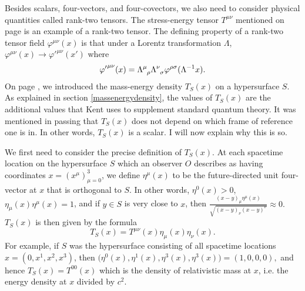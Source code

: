 Besides scalars, four-vectors, and four-covectors, we also need to consider physical quantities called rank-two tensors. The stress-energy tensor $T^{\mu\nu}$ mentioned on page \pageref{stressenergy} is an example of a rank-two tensor. The defining property of a rank-two tensor field $\varphi^{\mu\nu}(x)$ is that under a Lorentz transformation $\Lambda$, $\varphi^{\mu\nu}(x)\rightarrow{\varphi'}^{\mu\nu}(x')$ where
\begin{equation}\label{lorentztensor}
{\varphi'}^{\mu\nu}(x)=\Lambda\indices{^\mu_\rho}\Lambda\indices{^\nu_\sigma}\varphi^{\rho\sigma}(\Lambda^{-1}x).
\end{equation}
On page \pageref{massenergydensity}, we introduced the mass-energy density $T_S(x)$ on a hypersurface $S$. As explained in section \ref{massenergydensity}, the values of $T_S(x)$ are the additional values that Kent uses to supplement standard quantum theory.  It was mentioned in passing that $T_S(x)$ does not depend on which frame of reference one is in. In other words, $T_S(x)$ is a scalar. I will now explain why this is so. 

We first need to consider the precise definition of $T_S(x)$. At each spacetime location on the hypersurface $S$ which an observer $O$ describes as having coordinates $x=(x^\mu)_{\mu=0}^3$, we define  $\eta^\mu(x)$ to be the future-directed  unit four-vector at $x$ that is orthogonal to $S$. In other words, $\eta^0(x)>0$, $\eta_\mu(x)\eta^\mu(x)=1$, and if $y\in S$ is very close to $x$, then $\frac{(x-y)_\mu\eta^\mu(x)}{\sqrt{(x-y)_\nu(x-y)^\nu}}\approx 0.$  $T_S(x)$ is then given by the formula 
\begin{equation}\label{TSdef}
T_S(x)=T^{\mu\nu}(x)\eta_{\mu}(x)\eta_{\nu}(x).
\end{equation}
For example, if $S$ was the hypersurface consisting of all spacetime locations $x = (0,x^1,x^2,x^3)$, then $\big(\eta^{0}(x),\eta^{1}(x),\eta^{3}(x),\eta^{3}(x)\big) =(1,0,0,0),$ and hence $T_S(x)=T^{00}(x)$ which is the density of relativistic mass at $x$, i.e. the energy density at $x$ divided by $c^2$. 

